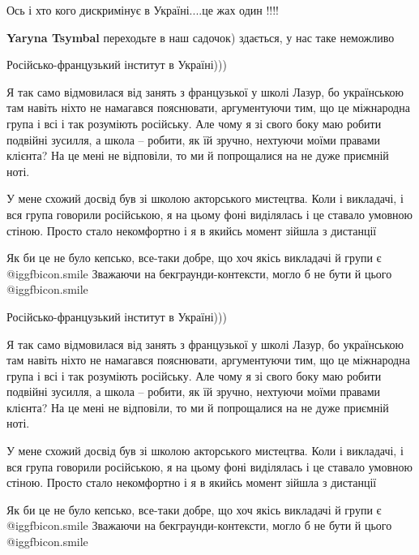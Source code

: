 \begin{itemize}
\begin{itemize}
Ось і хто кого дискримінує в Україні....це жах один !!!!

\textbf{Yaryna Tsymbal} переходьте в наш садочок) здається, у нас таке неможливо
\end{itemize} %

Російсько-французький інститут в Україні)))


Я так само відмовилася від занять з французької у школі Лазур, бо українською
там навіть ніхто не намагався пояснювати, аргументуючи тим, що це міжнародна
група і всі і так розуміють російську. Але чому я зі свого боку маю робити
подвійні зусилля, а школа – робити, як їй зручно, нехтуючи моїми правами
клієнта? На це мені не відповіли, то ми й попрощалися на не дуже приємній ноті.


У мене схожий досвід був зі школою акторського мистецтва. Коли і викладачі, і
вся група говорили російською, я на цьому фоні виділялась і це ставало умовною
стіною. Просто стало некомфортно і я в якийсь момент зійшла з дистанції


Як би це не було кепсько, все-таки добре, що хоч якісь викладачі й групи є  @igg{fbicon.smile} 
Зважаючи на бекграунди-контексти, могло б не бути й цього  @igg{fbicon.smile} 

Російсько-французький інститут в Україні)))


Я так само відмовилася від занять з французької у школі Лазур, бо українською
там навіть ніхто не намагався пояснювати, аргументуючи тим, що це міжнародна
група і всі і так розуміють російську. Але чому я зі свого боку маю робити
подвійні зусилля, а школа – робити, як їй зручно, нехтуючи моїми правами
клієнта? На це мені не відповіли, то ми й попрощалися на не дуже приємній ноті.


У мене схожий досвід був зі школою акторського мистецтва. Коли і викладачі, і
вся група говорили російською, я на цьому фоні виділялась і це ставало умовною
стіною. Просто стало некомфортно і я в якийсь момент зійшла з дистанції


Як би це не було кепсько, все-таки добре, що хоч якісь викладачі й групи є  @igg{fbicon.smile} 
Зважаючи на бекграунди-контексти, могло б не бути й цього  @igg{fbicon.smile} 


\end{itemize}
